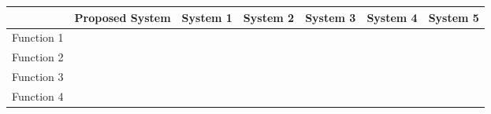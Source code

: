 \documentclass[12pt]{article}%
\begin{document}
\begin{center}
    \begin{tabular}{|l|l|l|l|l|l|l|}
        \hline
         & Proposed System & System 1 & System 2 & System 3 & System 4 & System 5 \\
         \hline
        Function 1 & & & & & & \\
        \hline
        Function 2 & & & & & & \\
        \hline
        Function 3 & & & & & & \\
        \hline
        Function 4 & & & & & & \\
         \hline
    \end{tabular}
\end{center}

\end{document}
